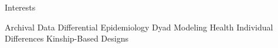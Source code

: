 \begin{rSection}{\textrm{Interests}} \begin{center}Archival Data \bigcdot Differential Epidemiology \bigcdot Dyad Modeling \bigcdot Health \bigcdot Individual Differences \bigcdot Kinship-Based Designs \end{center}
\end{rSection}